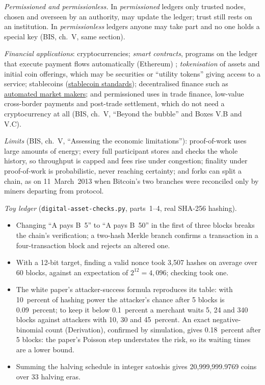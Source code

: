 \begin{qfdefinition}
\emph{Permissioned and permissionless.} In \emph{permissioned} ledgers only trusted nodes, chosen and overseen by an authority, may update the ledger; trust still rests on an institution. In \emph{permissionless} ledgers anyone may take part and no one holds a special key (BIS, ch.~V, same section).

\emph{Financial applications}: cryptocurrencies; \emph{smart contracts}, programs on the ledger that execute payment flows automatically (Ethereum) \citep[pp.~285--287]{crypto-narayanan}; \emph{tokenisation} of assets and initial coin offerings, which may be securities or ``utility tokens'' giving access to a service; stablecoins (\hyperref[rule:stablecoin-standards]{stablecoin standards}); decentralised finance such as \hyperref[def:amm-pool-mechanics]{automated market makers}; and permissioned uses in trade finance, low-value cross-border payments and post-trade settlement, which do not need a cryptocurrency at all (BIS, ch.~V, ``Beyond the bubble'' and Boxes V.B and V.C).

\emph{Limits} (BIS, ch.~V, ``Assessing the economic limitations''): proof-of-work uses large amounts of energy; every full participant stores and checks the whole history, so throughput is capped and fees rise under congestion; finality under proof-of-work is probabilistic, never reaching certainty; and forks can split a chain, as on 11~March~2013 when Bitcoin's two branches were reconciled only by miners departing from protocol.

 \emph{Toy ledger} (\texttt{digital-asset-checks.py}, parts~1--4, real SHA-256 hashing).
\begin{itemize}
\item Changing ``A pays B~5'' to ``A pays B~50'' in the first of three blocks breaks the chain's verification; a two-hash Merkle branch confirms a transaction in a four-transaction block and rejects an altered one.
\item With a 12-bit target, finding a valid nonce took 3{,}507 hashes on average over 60 blocks, against an expectation of $2^{12}=4{,}096$; checking took one.
\item The white paper's attacker-success formula reproduces its table: with 10~percent of hashing power the attacker's chance after 5 blocks is 0.09~percent; to keep it below 0.1~percent a merchant waits 5, 24 and 340 blocks against attackers with 10, 30 and 45~percent. An exact negative-binomial count (Derivation), confirmed by simulation, gives 0.18~percent after 5 blocks: the paper's Poisson step understates the risk, so its waiting times are a lower bound.
\item Summing the halving schedule in integer satoshis gives 20{,}999{,}999.9769 coins over 33 halving eras.
\end{itemize}


\end{qfdefinition}
